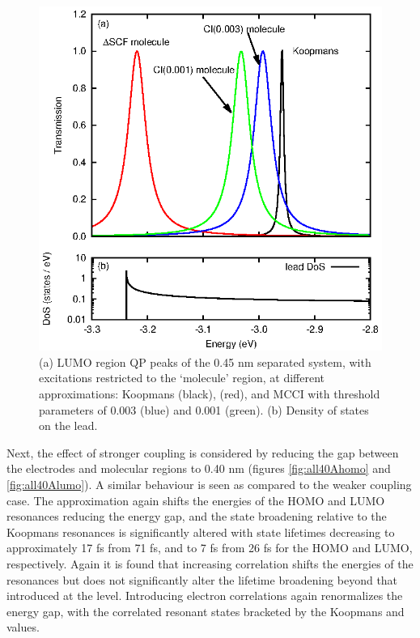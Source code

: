 \begin{figure}
	\begin{center}
		\includegraphics[width=0.9\linewidth]{figures/figure5a_5b}
	\end{center}
	\caption{(a) LUMO region \ac{QP} peaks of the 0.45 nm separated
	         system, with excitations restricted to the `molecule' region,
		 at different approximations: Koopmans (black),
		 \dscf (red), and MCCI with threshold parameters of
		 0.003 (blue) and 0.001 (green). (b) Density of states on the
		 lead.}
	\label{fig:all45Alumo}
\end{figure}

Next, the effect of stronger coupling is considered by reducing the gap
between the electrodes and molecular regions to 0.40 nm (figures
\ref{fig:all40Ahomo} and \ref{fig:all40Alumo}).
A similar behaviour is seen as compared to the weaker coupling case. The
\dscf approximation again shifts the energies of the HOMO and LUMO
resonances reducing the energy gap, and the state broadening relative to
the Koopmans resonances is significantly altered with state lifetimes
decreasing to approximately 17 fs from 71 fs, and to 7 fs from 26 fs for
the HOMO and LUMO, respectively.
Again it is found that increasing correlation shifts the energies of the
resonances but does not significantly alter the lifetime broadening beyond
that introduced at the \dscf level. Introducing electron correlations
again renormalizes the energy gap, with the correlated resonant states
bracketed by the Koopmans and \dscf values.

